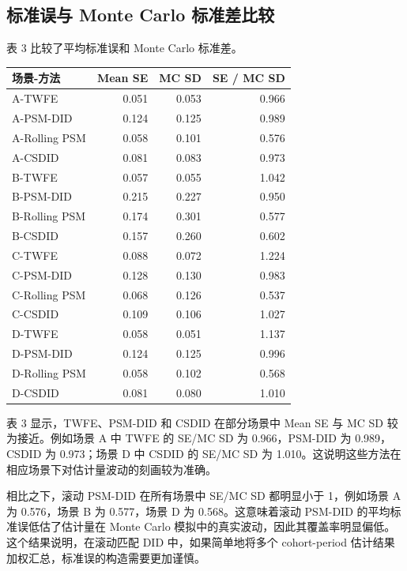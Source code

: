 \documentclass[
  fontset=windows]{ctexart}
\newcounter{none} %
\begin{document}
\subsection{标准误与 Monte Carlo
标准差比较}\label{ux6807ux51c6ux8befux4e0e-monte-carlo-ux6807ux51c6ux5deeux6bd4ux8f83}

表 3 比较了平均标准误和 Monte Carlo 标准差。

{\def\LTcaptype{none} %
\begin{longtable}[]{@{}lrrr@{}}
\toprule\noalign{}
场景-方法 & Mean SE & MC SD & SE / MC SD \\
\midrule\noalign{}
\endhead
\bottomrule\noalign{}
\endlastfoot
A-TWFE & 0.051 & 0.053 & 0.966 \\
A-PSM-DID & 0.124 & 0.125 & 0.989 \\
A-Rolling PSM & 0.058 & 0.101 & 0.576 \\
A-CSDID & 0.081 & 0.083 & 0.973 \\
B-TWFE & 0.057 & 0.055 & 1.042 \\
B-PSM-DID & 0.215 & 0.227 & 0.950 \\
B-Rolling PSM & 0.174 & 0.301 & 0.577 \\
B-CSDID & 0.157 & 0.260 & 0.602 \\
C-TWFE & 0.088 & 0.072 & 1.224 \\
C-PSM-DID & 0.128 & 0.130 & 0.983 \\
C-Rolling PSM & 0.068 & 0.126 & 0.537 \\
C-CSDID & 0.109 & 0.106 & 1.027 \\
D-TWFE & 0.058 & 0.051 & 1.137 \\
D-PSM-DID & 0.124 & 0.125 & 0.996 \\
D-Rolling PSM & 0.058 & 0.102 & 0.568 \\
D-CSDID & 0.081 & 0.080 & 1.010 \\
\end{longtable}
}

表 3 显示，TWFE、PSM-DID 和 CSDID 在部分场景中 Mean SE 与 MC SD
较为接近。例如场景 A 中 TWFE 的 SE/MC SD 为 0.966，PSM-DID 为
0.989，CSDID 为 0.973；场景 D 中 CSDID 的 SE/MC SD 为
1.010。这说明这些方法在相应场景下对估计量波动的刻画较为准确。

相比之下，滚动 PSM-DID 在所有场景中 SE/MC SD 都明显小于 1，例如场景 A 为
0.576，场景 B 为 0.577，场景 D 为 0.568。这意味着滚动 PSM-DID
的平均标准误低估了估计量在 Monte Carlo
模拟中的真实波动，因此其覆盖率明显偏低。这个结果说明，在滚动匹配 DID
中，如果简单地将多个 cohort-period
估计结果加权汇总，标准误的构造需要更加谨慎。
\end{document}
